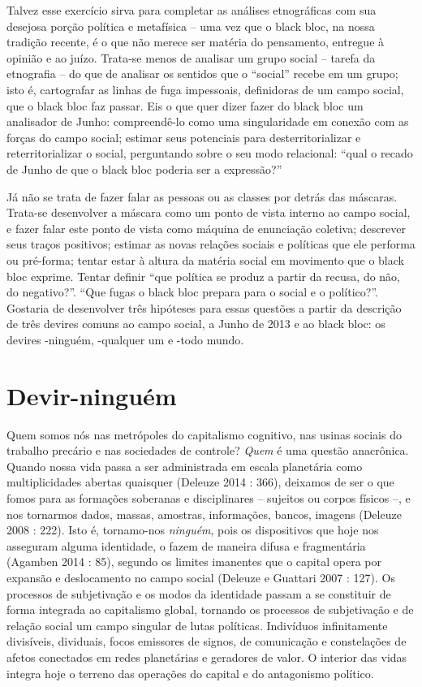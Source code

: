 Talvez esse exercício sirva para completar as análises etnográficas com
sua desejosa porção política e metafísica -- uma vez que o black bloc,
na nossa tradição recente, é o que não merece ser matéria do pensamento,
entregue à opinião e ao juízo. Trata-se menos de analisar um grupo
social -- tarefa da etnografia -- do que de analisar os sentidos que o
``social'' recebe em um grupo; isto é, cartografar as linhas de fuga
impessoais, definidoras de um campo social, que o black bloc faz passar.
Eis o que quer dizer fazer do black bloc um analisador de Junho:
compreendê-lo como uma singularidade em conexão com as forças do campo
social; estimar seus potenciais para desterritorializar e
reterritorializar o social, perguntando sobre o seu modo relacional:
``qual o recado de Junho de que o black bloc poderia ser a expressão?''

Já não se trata de fazer falar as pessoas ou as classes por detrás das
máscaras. Trata-se desenvolver a máscara como um ponto de vista interno
ao campo social, e fazer falar este ponto de vista como máquina de
enunciação coletiva; descrever seus traços positivos; estimar as novas
relações sociais e políticas que ele performa ou pré-forma; tentar estar
à altura da matéria social em movimento que o black bloc exprime. Tentar
definir ``que política se produz a partir da recusa, do não, do
negativo?''. ``Que fugas o black bloc prepara para o social e o
político?''. Gostaria de desenvolver três hipóteses para essas questões
a partir da descrição de três devires comuns ao campo social, a Junho de
2013 e ao black bloc: os devires -ninguém, -qualquer um e -todo mundo.

\section{Devir-ninguém}

Quem somos nós nas metrópoles do capitalismo
cognitivo, nas usinas sociais do trabalho precário e nas sociedades de
controle? \emph{Quem} é uma questão anacrônica. Quando nossa vida passa
a ser administrada em escala planetária como multiplicidades abertas
quaisquer (Deleuze 2014 : 366), deixamos de ser o que fomos para as
formações soberanas e disciplinares -- sujeitos ou corpos físicos --, e
nos tornarmos dados, massas, amostras, informações, bancos, imagens
(Deleuze 2008 : 222). Isto é, tornamo-nos \emph{ninguém}, pois os
dispositivos que hoje nos asseguram alguma identidade, o fazem de
maneira difusa e fragmentária (Agamben 2014 : 85), segundo os limites
imanentes que o capital opera por expansão e deslocamento no campo
social (Deleuze e Guattari 2007 : 127). Os processos de subjetivação e
os modos da identidade passam a se constituir de forma integrada ao
capitalismo global, tornando os processos de subjetivação e de relação
social um campo singular de lutas políticas. Indivíduos infinitamente
divisíveis, dividuais, focos emissores de signos, de comunicação e
constelações de afetos conectados em redes planetárias e geradores de
valor. O interior das vidas integra hoje o terreno das operações do
capital e do antagonismo político.

